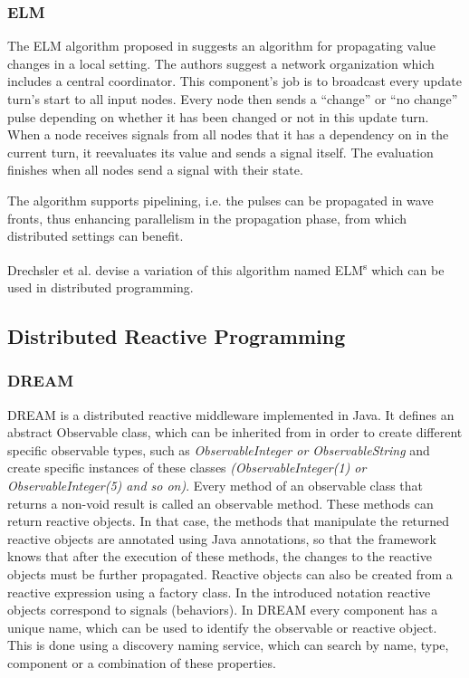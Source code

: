 \documentclass{sigplanconf}
\begin{document}
\subsubsection{ELM}
The ELM algorithm proposed in \cite{elm} suggests an algorithm for propagating value changes in a local setting. The authors suggest a network organization which includes a central coordinator. This component's job is to broadcast every update turn's start to all input nodes. Every node then sends a “change” or “no change” pulse depending on whether it has been changed or not in this update turn. When a node receives signals from all nodes that it has a dependency on in the current turn, it reevaluates its value and sends a signal itself. The evaluation finishes when all nodes send a signal with their state.

The algorithm supports pipelining, i.e. the pulses can be propagated in wave fronts, thus enhancing parallelism in the propagation phase, from which distributed settings can benefit.

Drechsler et al. \cite{sidup} devise a variation of this algorithm named ELM\textsuperscript{s} which can be used in distributed programming.

\subsection{Distributed Reactive Programming}

\subsubsection{DREAM}
DREAM \cite{dream} is a distributed reactive middleware implemented in Java. It defines an abstract Observable class, which can be inherited from in order to create different specific observable types, such as \textit{ObservableInteger or ObservableString} and create specific instances of these classes \textit{(ObservableInteger(1) or ObservableInteger(5) and so on)}. Every method of an observable class that returns a non-void result is called an observable method. These methods can return reactive objects. In that case, the methods that manipulate the returned reactive objects are annotated using Java annotations, so that the framework knows that after the execution of these methods, the changes to the reactive objects must be further propagated. 
Reactive objects can also be created from a reactive expression using a factory class. In the introduced notation reactive objects correspond to signals (behaviors).
In DREAM every component has a unique name, which can be used to identify the observable or reactive object. This is done using a discovery naming service, which can search by name, type, component or a combination of these properties.
\end{document}

